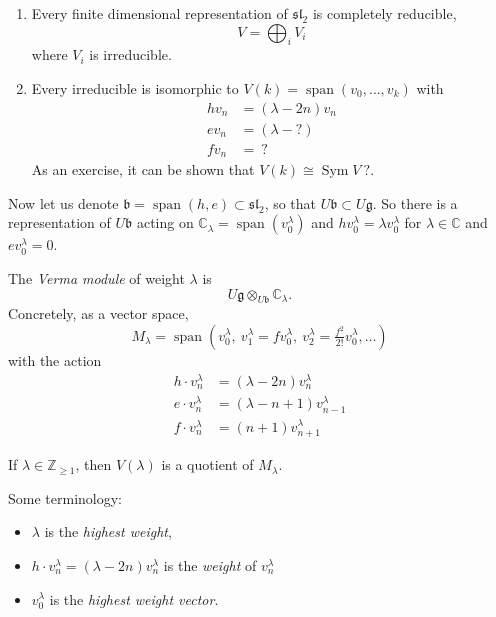 \begin{theorem}
\label{theorem-l1-sl2-representations}
\begin{enumerate}
\item Every finite dimensional
representation of $\mathfrak{sl}_{2}$ is
completely reducible,
$$
V=\bigoplus_{i}V_{i}
$$
where $V_{i}$ is irreducible.
\item Every irreducible is isomorphic to
$V(k)=\operatorname{span}
(v_{0},\ldots,v_{k})$ with
$$
\begin{aligned}
hv_{n}&=(\lambda-2n)v_{n}\\
ev_{n}&=(\lambda-?)\\
fv_{n}&=\ ?
\end{aligned}
$$
As an exercise, it can be shown that
$V(k)\cong \operatorname{Sym} V\ ?$.
\end{enumerate}
\end{theorem}

Now let us denote $\mathfrak{b}=
\operatorname{span}(h,e)\subset
\mathfrak{sl}_{2}$, so that
$U\mathfrak{b}\subset U\mathfrak{g}$. So
there is a representation of
$U\mathfrak{b}$ acting on
$\mathbb{C}_{\lambda}=
\operatorname{span}(v_{0}^{\lambda})$
and $hv_{0}^{\lambda} =\lambda
v_{0}^{\lambda}$ for
$\lambda\in \mathbb{C}$ and
$ev_{0}^{\lambda}=0$.

\begin{definition}
\label{definition-l1-verma-module}
The {\it Verma module} of weight
$\lambda$ is
$$
U\mathfrak{g}\otimes_{U\mathfrak{b}}
\mathbb{C}_{\lambda}.
$$
Concretely, as a vector space,
$$
M_{\lambda}=\operatorname{span}
(v_{0}^{\lambda},\
v_{1}^{\lambda} =fv_{0}^{\lambda},\
v_{2}^{\lambda}
=\tfrac{f^{2}}{2!} v_{0}^{\lambda},
\ldots)
$$
with the action
$$
\begin{aligned}
h\cdot v_{n}^{\lambda}
&=(\lambda-2n)v_{n}^{\lambda} \\
e\cdot v_{n}^{\lambda}
&=(\lambda-n+1)v_{n-1}^{\lambda}\\
f \cdot v_{n}^{\lambda}
&=(n+1)v^{\lambda}_{n+1}
\end{aligned}
$$
\end{definition}

\begin{proposition}
\label{proposition-l1-quotient}
If $\lambda\in \mathbb{Z}_{\geq 1}$, then
$V(\lambda)$ is a quotient of
$M_{\lambda}$.
\end{proposition}

Some terminology:
\begin{itemize}
\item $\lambda$ is the {\it highest
weight},
\item $h\cdot v_{n}^{\lambda}
=(\lambda-2n)v_{n}^{\lambda}$ is the
{\it weight} of $v_{n}^{\lambda}$
\item $v_{0}^{\lambda}$ is the
{\it highest weight vector}.
\end{itemize}

